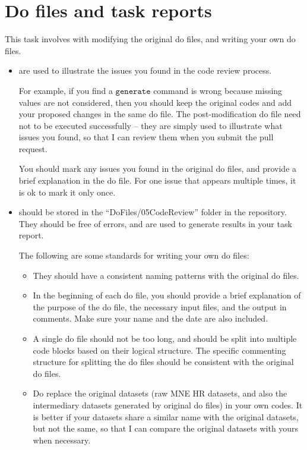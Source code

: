 \documentclass[12pt]{article}
\newcommand{\highlightP}[1]{{\emph{\color{MyPink}{#1}}}}
\theoremstyle{definition}
\begin{document}
\section{Do files and task reports} \label{sec_standards}

This task involves with modifying the original do files, and writing your own do files. \highlightP{A general principle is that changes to the original do files should be used for illustration, and actual changes should be stored in your own do files, and uploaded to the ``DoFiles/05CodeReview'' folder in the repository.}

\begin{itemize}[topsep=0pt, leftmargin=20pt, itemsep=0pt]
	\setlength{\parskip}{10pt} 

    \item \highlightP{Changes in original do files} are used to illustrate the issues you found in the code review process. 
    
    For example, if you find a $\mathtt{generate}$ command is wrong because missing values are not considered, then you should keep the original codes and add your proposed changes in the same do file. The post-modification do file need not to be executed successfully -- they are simply used to illustrate what issues you found, so that I can review them when you submit the pull request.
    
    You should mark any issues you found in the original do files, and provide a brief explanation in the do file. For one issue that appears multiple times, it is ok to mark it only once.

    \item \highlightP{Your own do files} should be stored in the ``DoFiles/05CodeReview'' folder in the repository. They should be free of errors, and are used to generate results in your task report.
    
    The following are some standards for writing your own do files:
    \begin{itemize}[topsep=0pt, leftmargin=22pt, itemsep=0pt]
        \setlength{\parskip}{10pt} 
        \item They should have a consistent naming patterns with the original do files. 
        \item In the beginning of each do file, you should provide a brief explanation of the purpose of the do file, the necessary input files, and the output in comments. Make sure your name and the date are also included.
        \item A single do file should not be too long, and should be split into multiple code blocks based on their logical structure. The specific commenting structure for splitting the do files should be consistent with the original do files.
        \item Do \highlightP{not} replace the original datasets (raw MNE HR datasets, and also the intermediary datasets generated by original do files) in your own codes. It is better if your datasets share a similar name with the original datasets, but not the same, so that I can compare the original datasets with yours when necessary. 
        

\end{itemize}
\end{itemize}
\end{document}
